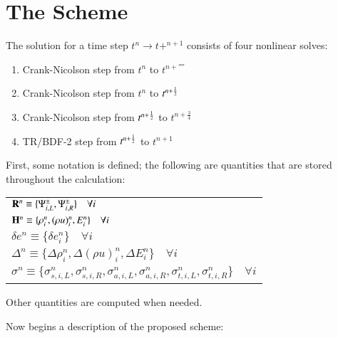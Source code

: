 \section{The Scheme}

The solution for a time step $t^n\rightarrow t+^{n+1}$ consists of four
nonlinear solves:

\begin{enumerate}
  \item Crank-Nicolson step from $t^n$ to $t^{n+\fourth}$
  \item Crank-Nicolson step from $t^n$ to $t^{n+\frac{1}{2}}$
  \item Crank-Nicolson step from $t^{n+\frac{1}{2}}$ to $t^{n+\frac{3}{4}}$
  \item TR/BDF-2 step from $t^{n+\frac{1}{2}}$ to $t^{n+1}$
\end{enumerate}

First, some notation is defined; the following are quantities that are stored
throughout the calculation:
\begin{center}
\begin{tabular}{l}
   $\mathbf{R}^n \equiv \{\Psi^\pm_{i,L},\Psi^\pm_{i,R}\} \quad\forall i$ \\
   $\mathbf{H}^n \equiv \{\rho_i^n, (\rho u)_i^n, E_i^n\} \quad\forall i$ \\
   $\delta e^n \equiv \{\delta e_i^n\} \quad\forall i$ \\
   $\Delta^n \equiv \{\Delta\rho_i^n, \Delta(\rho u)_i^n, \Delta E_i^n\} \quad\forall i$ \\
   $\sigma^n \equiv \{\sigma_{s,i,L}^n, \sigma_{s,i,R}^n,
   \sigma_{a,i,L}^n, \sigma_{a,i,R}^n, \sigma_{t,i,L}^n, \sigma_{t,i,R}^n\}
   \quad\forall i$
\end{tabular}
\end{center}
Other quantities are computed when needed.

Now begins a description of the proposed scheme:

